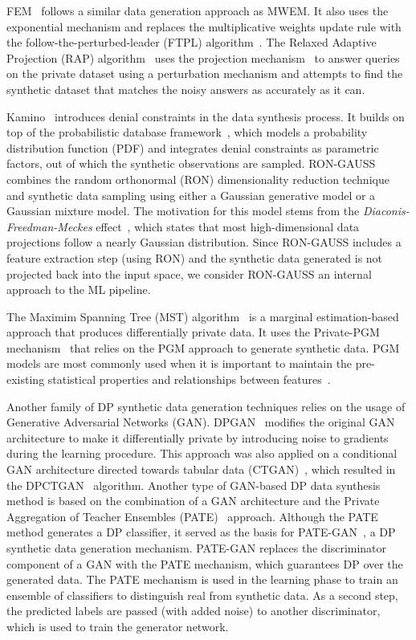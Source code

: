 FEM~\cite{vietri2020new} follows a similar data generation approach as MWEM\@.
It also uses the exponential mechanism and replaces the multiplicative weights
update rule with the follow-the-perturbed-leader (FTPL)
algorithm~\cite{kalai2005efficient}. The Relaxed Adaptive Projection (RAP)
algorithm~\cite{aydore2021differentially} uses the projection
mechanism~\cite{nikolov2013geometry} to answer queries on the private dataset
using a perturbation mechanism and attempts to find the synthetic dataset that
matches the noisy answers as accurately as it can.

Kamino~\cite{ge2021kamino} introduces denial constraints in the data synthesis
process. It builds on top of the probabilistic database
framework~\cite{de2019formal, suciu2011probabilistic}, which models a
probability distribution function (PDF) and integrates denial constraints as
parametric factors, out of which the synthetic observations are sampled.
RON-GAUSS~\cite{chanyaswad2019ron} combines the random orthonormal (RON)
dimensionality reduction technique and synthetic data sampling using either a
Gaussian generative model or a Gaussian mixture model. The motivation for this
model stems from the \textit{Diaconis-Freedman-Meckes}
effect~\cite{meckes2012projections}, which states that most high-dimensional
data projections follow a nearly Gaussian distribution. Since RON-GAUSS
includes a feature extraction step (using RON) and the synthetic data
generated is not projected back into the input space, we consider RON-GAUSS an
internal approach to the ML pipeline.

The Maximim Spanning Tree (MST) algorithm~\cite{mckenna2021winning} is a
marginal estimation-based approach that produces differentially private data.
It uses the Private-PGM mechanism~\cite{mckenna2019graphical} that relies on
the PGM approach to generate synthetic data. PGM models are most commonly used
when it is important to maintain the pre-existing statistical properties and
relationships between features~\cite{young2009using}.

Another family of DP synthetic data generation techniques relies on the usage
of Generative Adversarial Networks (GAN). DPGAN~\cite{xie2018differentially}
modifies the original GAN architecture to make it differentially private by
introducing noise to gradients during the learning procedure. This approach
was also applied on a conditional GAN architecture directed towards tabular
data (CTGAN)~\cite{xu2019modeling}, which resulted in the
DPCTGAN~\cite{rosenblatt2020differentially} algorithm. Another type of
GAN-based DP data synthesis method is based on the combination of a GAN
architecture and the Private Aggregation of Teacher Ensembles
(PATE)~\cite{papernot2017semi} approach. Although the PATE method generates a
DP classifier, it served as the basis for PATE-GAN~\cite{jordon2018pate}, a DP
synthetic data generation mechanism. PATE-GAN replaces the discriminator
component of a GAN with the PATE mechanism, which guarantees DP over the
generated data. The PATE mechanism is used in the learning phase to train an
ensemble of classifiers to distinguish real from synthetic data. As a second
step, the predicted labels are passed (with added noise) to another
discriminator, which is used to train the generator network.

